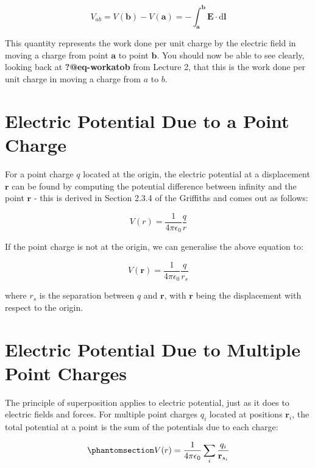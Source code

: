 \documentclass[
  letterpaper,
  DIV=11,
  numbers=noendperiod]{scrreprt}
\begin{document}
\[ V_{ab} = V(\mathrm{\mathbf{b}}) − V(\mathrm{\mathbf{a}}) = -\int_{\mathrm{\mathbf{a}}}^{\mathrm{\mathbf{b}}} \mathrm{\mathbf{E}}\cdot \mathrm{d} \mathrm{\mathbf{l}}\]

This quantity represents the work done per unit charge by the electric
field in moving a charge from point \(\mathrm{\mathbf{a}}\) to point
\(\mathrm{\mathbf{b}}\). You should now be able to see clearly, looking
back at \textbf{?@eq-workatob} from Lecture 2, that this is the work
done per unit charge in moving a charge from \(a\) to \(b\).

\section{Electric Potential Due to a Point
Charge}\label{electric-potential-due-to-a-point-charge}

For a point charge \(q\) located at the origin, the electric potential
at a displacement \(\mathrm{\mathbf{r}}\) can be found by computing the
potential difference between infinity and the point
\(\mathrm{\mathbf{r}}\) - this is derived in Section 2.3.4 of the
Griffiths and comes out as follows:

\[ V(r) = \frac{1}{4\pi\epsilon_0} \frac{q}{r} \]

If the point charge is not at the origin, we can generalise the above
equation to:

\[ V(\mathrm{\mathbf{r}}) = \frac{1}{4\pi\epsilon_0} \frac{q}{r_s} \]

where \(r_s\) is the separation between \(q\) and
\(\mathrm{\mathbf{r}}\), with \(\mathrm{\mathbf{r}}\) being the
displacement with respect to the origin.

\section{Electric Potential Due to Multiple Point
Charges}\label{electric-potential-due-to-multiple-point-charges}

The principle of superposition applies to electric potential, just as it
does to electric fields and forces. For multiple point charges \(q_i\)
located at positions \(\mathrm{\mathbf{r}}_i\), the total potential at a
point is the sum of the potentials due to each
charge:

\begin{equation}\phantomsection\label{eq-Vmulti}{ V(r) = \frac{1}{4\pi \epsilon_0} \sum_{i} \frac{q_i}{\mathrm{\mathbf{r}}_{s_i}} }\end{equation}
\end{document}
